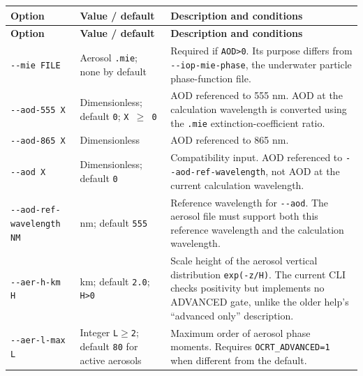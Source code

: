 {\TableFont
\begin{longtable}{@{}>{\raggedright\arraybackslash}p{}>{\raggedright\arraybackslash}p{}>{\raggedright\arraybackslash}p{}@{}}
\toprule
\textbf{Option} & \textbf{Value / default} & \textbf{Description and conditions} \\
\midrule
\endfirsthead
\toprule
\textbf{Option} & \textbf{Value / default} & \textbf{Description and conditions} \\
\midrule
\endhead
\bottomrule
\endfoot
\texttt{-\allowbreak{}-\allowbreak{}mie FILE} & Aerosol \texttt{.\allowbreak{}mie}; none by default & Required if \texttt{AOD>0}. Its purpose differs from \texttt{-\allowbreak{}-\allowbreak{}iop-\allowbreak{}mie-\allowbreak{}phase}, the underwater particle phase-function file. \\
\texttt{-\allowbreak{}-\allowbreak{}aod-\allowbreak{}555 X} & Dimensionless; default \texttt{0}; \texttt{X \ensuremath{\geq} 0} & AOD referenced to 555 nm. AOD at the calculation wavelength is converted using the \texttt{.\allowbreak{}mie} extinction-coefficient ratio. \\
\texttt{-\allowbreak{}-\allowbreak{}aod-\allowbreak{}865 X} & Dimensionless & AOD referenced to 865 nm. \\
\texttt{-\allowbreak{}-\allowbreak{}aod X} & Dimensionless; default \texttt{0} & Compatibility input. AOD referenced to \texttt{-\allowbreak{}-\allowbreak{}aod-\allowbreak{}ref-\allowbreak{}wavelength}, not AOD at the current calculation wavelength. \\
\texttt{-\allowbreak{}-\allowbreak{}aod-\allowbreak{}ref-\allowbreak{}wavelength NM} & nm; default \texttt{555} & Reference wavelength for \texttt{-\allowbreak{}-\allowbreak{}aod}. The aerosol file must support both this reference wavelength and the calculation wavelength. \\
\texttt{-\allowbreak{}-\allowbreak{}aer-\allowbreak{}h-\allowbreak{}km H} & km; default \texttt{2.\allowbreak{}0}; \texttt{H>0} & Scale height of the aerosol vertical distribution \texttt{exp(-\allowbreak{}z/\allowbreak{}H)}. The current CLI checks positivity but implements no ADVANCED gate, unlike the older help's “advanced only” description. \\
\texttt{-\allowbreak{}-\allowbreak{}aer-\allowbreak{}l-\allowbreak{}max L} & Integer \texttt{L\ensuremath{\geq}2}; default \texttt{80} for active aerosols & Maximum order of aerosol phase moments. Requires \texttt{OCRT\_\allowbreak{}ADVANCED=\allowbreak{}1} when different from the default. \\
\end{longtable}
}

